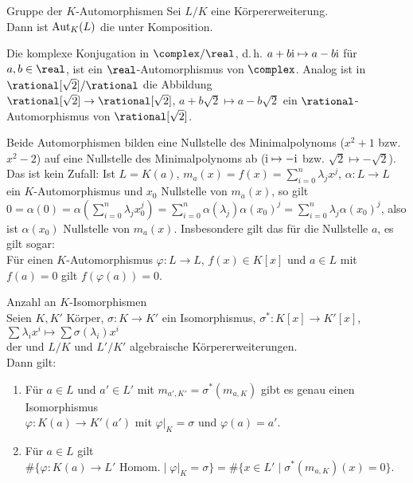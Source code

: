 \begin{Def}{Gruppe der $K$-Automorphismen}
    Sei $L/K$ eine Körpererweiterung.\\
    Dann ist $\operatorname{Aut}_K(L)$ die 
    unter Komposition.
\end{Def}

\begin{Bsp}
    Die komplexe Konjugation in $\complex/\real$, d.\,h.
    $a + b\text{i} \mapsto a - b\text{i}$ für $a, b \in \real$, ist ein
    $\real$-Automorphismus von $\complex$.
    Analog ist in $\rational[\sqrt{2}]/\rational$ die Abbildung\\
    $\rational[\sqrt{2}] \rightarrow \rational[\sqrt{2}]$,
    $a + b\sqrt{2} \mapsto a - b\sqrt{2}$ ein
    $\rational$-Automorphismus von $\rational[\sqrt{2}]$.
\end{Bsp}

\begin{Bem}
    Beide Automorphismen bilden eine Nullstelle des Minimalpolynoms
    ($x^2 + 1$ bzw. $x^2 - 2$) auf eine Nullstelle des Minimalpolynoms ab
    ($\text{i} \mapsto -\text{i}$ bzw. $\sqrt{2} \mapsto -\sqrt{2}$).
    Das ist kein Zufall:
    Ist $L = K(a)$, $m_a(x) = f(x) = \sum_{i=0}^n \lambda_j x^j$,
    $\alpha\colon L \rightarrow L$ ein $K$-Automorphismus und
    $x_0$ Nullstelle von $m_a(x)$, so gilt
    $0 = \alpha(0) = \alpha(\sum_{i=0}^n \lambda_j x_0^j) =
    \sum_{i=0}^n \alpha(\lambda_j) \alpha(x_0)^j =
    \sum_{i=0}^n \lambda_j \alpha(x_0)^j$, also ist $\alpha(x_0)$ Nullstelle
    von $m_a(x)$.
    Insbesondere gilt das für die Nullstelle $a$, es gilt sogar:\\
    Für einen $K$-Automorphismus $\varphi\colon L \rightarrow L$,
    $f(x) \in K[x]$ und $a \in L$ mit $f(a) = 0$ gilt
    $f(\varphi(a)) = 0$.
\end{Bem}

\linie
\pagebreak

\begin{Prop}{Anzahl an $K$-Isomorphismen}\\
    Seien $K, K'$ Körper, $\sigma\colon K \rightarrow K'$ ein
    Isomorphismus, $\sigma^\ast\colon K[x] \rightarrow K'[x]$,
    $\sum \lambda_i x^i \mapsto \sum \sigma(\lambda_i) x^i$\\
    der  und
    $L/K$ und $L'/K'$ algebraische Körpererweiterungen.\\
    Dann gilt:
    \begin{enumerate}[label=(\alph*)]
        \item
        Für $a \in L$ und $a' \in L'$ mit
        $m_{a',K'} = \sigma^\ast(m_{a,K})$ gibt es genau einen Isomorphismus\\
        $\varphi\colon K(a) \rightarrow K'(a')$ mit $\varphi|_K = \sigma$ und
        $\varphi(a) = a'$.

        \item
        Für $a \in L$ gilt
        $\#\{\varphi\colon K(a) \rightarrow L' \text{ Homom.}
        \;|\; \varphi|_K = \sigma\} =
        \#\{x \in L' \;|\; \sigma^\ast(m_{a,K})(x) = 0\}$.
    \end{enumerate}
\end{Prop}

